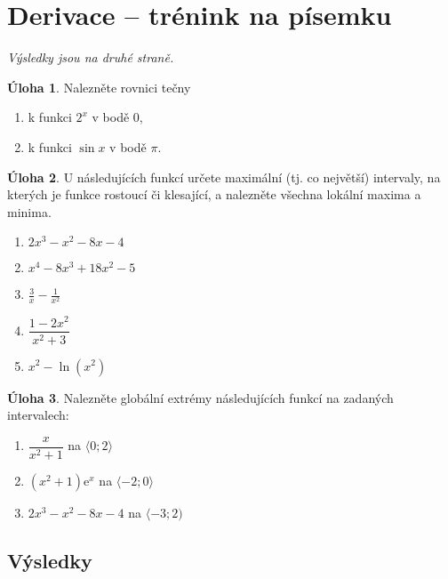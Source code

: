 \documentclass[12pt,a4paper]{article}
\theoremstyle{definition}
\newtheorem{uloha}{Úloha}
\def\ee{\mathrm{e}}
\begin{document}
\section*{Derivace -- trénink na písemku}

\emph{Výsledky jsou na druhé straně.}

\begin{uloha}
Nalezněte rovnici tečny %
\begin{enumerate}
	\item k funkci $2^x$ v bodě $0$,
	\item k funkci $\sin x$ v bodě $\pi$.
\end{enumerate}
\end{uloha}


\begin{uloha}
U následujících funkcí určete maximální (tj. co největší) intervaly, na kterých je funkce rostoucí či klesající, a nalezněte všechna lokální maxima a minima.
\begin{enumerate}
	\item $2 x^3 - x^2 - 8 x - 4$
	\item $x^4 - 8 x^3 + 18 x^2 - 5$
	\item $\displaystyle \frac3x - \frac{1}{x^2}$
	\item $\dfrac{1-2x^2}{x^2+3}$
	\item $x^2 - \ln(x^2)$
\end{enumerate}
\end{uloha}

\begin{uloha}
Nalezněte globální extrémy následujících funkcí na zadaných intervalech:
\begin{enumerate}
	\item $\dfrac{x}{x^2+1}$ na $\langle0; 2\rangle$
	\item $(x^2+1)\ee^{x}$ na $\langle-2; 0\rangle$
	\item $2 x^3 - x^2 - 8 x - 4$ na $\langle -3; 2)$
\end{enumerate}
\end{uloha}




\newpage



\subsection*{Výsledky}
\end{document}
